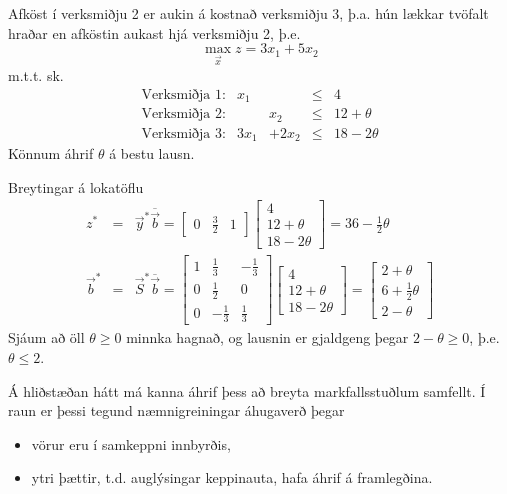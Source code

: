 \begin{daemi} Afköst í verksmiðju 2 er aukin á kostnað verksmiðju 3, þ.a. hún lækkar tvöfalt hraðar en afköstin aukast hjá verksmiðju 2, þ.e.
$$ \max_{\vec{x}} z=3x_1+5x_2$$
m.t.t. sk.
\[\begin{array}{lrrcl}
\mbox{Verksmiðja 1:} & x_1 & &\leq& 4\\
\mbox{Verksmiðja 2:} & & x_2 &\leq& 12+\theta \\
\mbox{Verksmiðja 3:} & 3x_1& +2x_2&\leq& 18-2\theta
\end{array}\]
Könnum áhrif $\theta$ á bestu lausn.
\end{daemi}
\begin{lausn}Breytingar á lokatöflu
\begin{eqnarray*}
 z^*&=&\vec{y}^*\overline{\vec{b}}=\begin{bmatrix}0&\frac{3}{2}&1\end{bmatrix}\begin{bmatrix}4\\12+\theta\\18-2\theta\end{bmatrix}=36-\frac{1}{2}\theta\\
\vec{b}^*&=&\vec{S}^*\overline{\vec{b}}=\begin{bmatrix}1&\frac{1}{3}&-\frac{1}{3}\\0&\frac{1}{2}&0\\0&-\frac{1}{3}&\frac{1}{3}\end{bmatrix}\begin{bmatrix}4\\12+\theta\\18-2\theta\end{bmatrix}=\begin{bmatrix}2+\theta\\6+\frac{1}{2}\theta\\2-\theta\end{bmatrix}
\end{eqnarray*}
Sjáum að öll $\theta\geq0$ minnka hagnað, og lausnin er gjaldgeng þegar $2-\theta\geq0$, þ.e. $\theta \leq 2$. 
\end{lausn}
Á hliðstæðan hátt má kanna áhrif þess að breyta markfallsstuðlum samfellt. Í raun er þessi tegund næmnigreiningar áhugaverð þegar 
\begin{itemize}
 \item vörur eru í samkeppni innbyrðis,
 \item ytri þættir, t.d. auglýsingar keppinauta, hafa áhrif á framlegðina.
\end{itemize}
